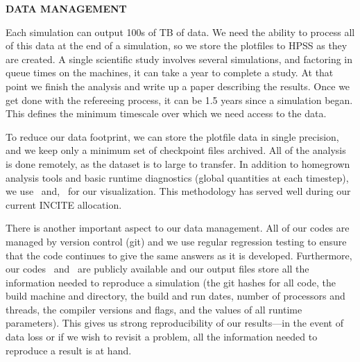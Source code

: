 \documentclass[11pt,letterpaper,english]{article}
\begin{document}

\pagestyle{fancy} 
 \renewcommand{%
\headrulewidth}{0.0pt}


\begin{center}
\bf {DATA MANAGEMENT}
\end{center}





Each simulation can output 100s of TB of data.  We need the ability to
process all of this data at the end of a simulation, so we store the
plotfiles to HPSS as they are created.  A single scientific study
involves several simulations, and factoring in queue times on the
machines, it can take a year to complete a study.  At that point we
finish the analysis and write up a paper describing the results.  Once
we get done with the refereeing process, it can be 1.5 years since a
simulation began.  This defines the minimum timescale over which we
need access to the data.


To reduce our data footprint, we can store the plotfile data in single
precision, and we keep only a minimum set of checkpoint files
archived.  All of the analysis is done remotely, as the dataset is to
large to transfer.  In addition to homegrown analysis tools and basic
runtime diagnostics (global quantities at each timestep), we use
\visit\ and, \yt\ for our visualization.  This methodology
has served well during our current INCITE allocation.

There is another important aspect to our data management.  All of our
codes are managed by version control (git) and we use regular
regression testing to ensure that the code continues to give the same
answers as it is developed.  Furthermore, our codes \maestro\ and
\castro\ are publicly available and our output files store all the
information needed to reproduce a simulation (the git hashes for all
code, the build machine and directory, the build and run dates, number
of processors and threads, the compiler versions and flags, and the
values of all runtime parameters).  This gives us strong
reproducibility of our results---in the event of data loss or if we
wish to revisit a problem, all the information needed to reproduce a
result is at hand.
\end{document}
